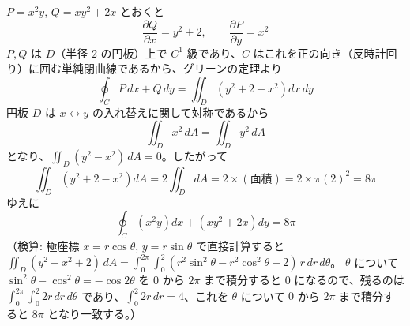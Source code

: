 
$P = x^{2}y$, $Q = xy^{2} + 2x$ とおくと
\[
\frac{\partial Q}{\partial x} = y^{2} + 2, \qquad \frac{\partial P}{\partial y} = x^{2}
\]
$P, Q$ は $D$（半径 $2$ の円板）上で $C^{1}$ 級であり、$C$ はこれを正の向き（反時計回り）に囲む単純閉曲線であるから、グリーンの定理より
\[
\oint_{C} P\,dx + Q\,dy = \iint_{D} \left( y^{2} + 2 - x^{2} \right) dx\,dy
\]
円板 $D$ は $x \leftrightarrow y$ の入れ替えに関して対称であるから
\[
\iint_{D} x^{2}\,dA = \iint_{D} y^{2}\,dA
\]
となり、$\iint_{D} (y^{2} - x^{2})\,dA = 0$。したがって
\[
\iint_{D} \left( y^{2} + 2 - x^{2} \right) dA = 2\iint_{D} dA = 2 \times (\text{面積}) = 2 \times \pi (2)^{2} = 8\pi
\]
ゆえに
\[
\boxed{\; \oint_{C} \left(x^{2}y\right) dx + \left(xy^{2} + 2x\right) dy = 8\pi \;}
\]
（検算: 極座標 $x = r\cos\theta$, $y = r\sin\theta$ で直接計算すると
$\iint_D (y^2 - x^2 + 2)\,dA = \int_0^{2\pi}\!\!\int_0^{2} (r^2\sin^2\theta - r^2\cos^2\theta + 2)\, r\,dr\,d\theta$。
$\theta$ について $\sin^2\theta - \cos^2\theta = -\cos 2\theta$ を $0$ から $2\pi$ まで積分すると $0$ になるので、残るのは
$\int_0^{2\pi}\!\!\int_0^2 2r\,dr\,d\theta$ であり、$\int_0^2 2r\,dr = 4$、これを $\theta$ について $0$ から $2\pi$ まで積分すると $8\pi$ となり一致する。）
